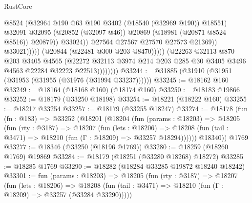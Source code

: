 \begin{lexlean}{RustCore}
\begin{coremodule}
                                            @8524
                                            (@32964
                                              @190
                                              @63
                                              @190
                                              @3402
                                              (@18540 (@32969 @190))
                                              @18551)
                                            @32091
                                            @32095
                                            (@20852 (@32097 @46))
                                            @20869
                                            (@18981 (@20871 @8524 @8516))
                                            @20879))
                                        @33024))
                                    @27564
                                    @27567
                                    @27570
                                    @27573
                                    @21369))
                                @33021)))))
                      (@20844 (@22481 @300 @203 @8470)))))
                (@22263
                  @32113
                  @870
                  @203
                  @3405
                  @4565
                  (@22272
                    @32113
                    @3974
                    @214
                    @203
                    @285
                    @30
                    @3405
                    @3496
                    @4563
                    @22284
                    @32223
                    @22513))))))))
@33244 := @31885 (@31910 (@31951 (@31953 (@31955 (@31976 (@31994 @33237))))))
@33245 := @18162 @160
@33249 := @18164 (@18168 @160) (@18174 @160)
@33250 := @18183 @19866
@33252 := @18179 (@33250 @18198)
@33254 := @18221 (@18222 @160)
@33255 := @18217 @33254
@33257 := @18179 (@33255 @18247)
@33274 := @18178
    (fun (fn : @183) =>
    @33252
      (@18201
        (@18204
          (fun (params : @18203) =>
          @18205
            (fun (rty : @3187) =>
            @18207
              (fun (lets : @18206) =>
              @18208 (fun (tail : @3471) => @18210 (fun (Γ : @18209) => @33257 @18294))))))
        @18340))
    @1769
@33277 := @18346 (@33250 (@18196 @1769))
@33280 := @18259 (@18260 @1769) @19869
@33284 := @18179 (@18251 (@33280 @18268) @18272)
@33285 := @18285 @1769
@33290 := @18282 (@18284 @33285 @19872 @18240 @18242)
@33301 := fun (params : @18203) =>
  @18205
    (fun (rty : @3187) =>
    @18207
      (fun (lets : @18206) =>
      @18208 (fun (tail : @3471) => @18210 (fun (Γ : @18209) => @33257 (@33284 @33290)))))

\end{coremodule}
\end{lexlean}
